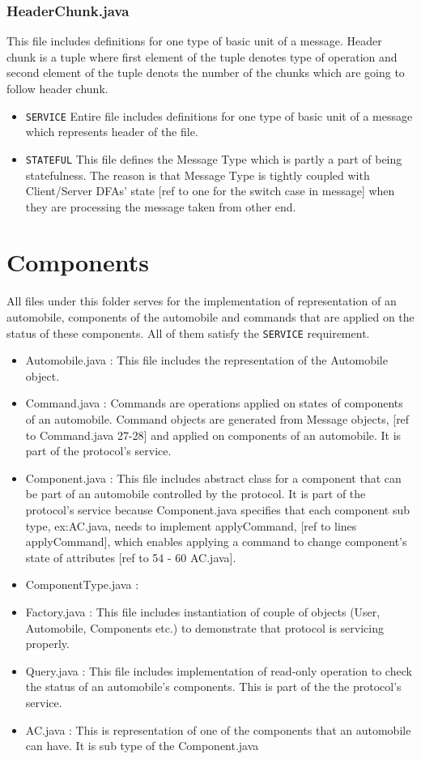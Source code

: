 \documentclass[12pt]{usenixsubmit}
\begin{document}
    \subsubsection{HeaderChunk.java}This file includes definitions for one type of basic unit of a message. Header chunk is a tuple where first element of the tuple denotes type of operation and second element of the tuple denots the number of the chunks which are going to follow header chunk.
    \begin{itemize}
    \item {\tt SERVICE} Entire file includes definitions for one type of basic unit of a message which represents header of the file.
      \item {\tt STATEFUL} This file defines the Message Type  which is partly a part of being statefulness. The reason is that Message Type is tightly coupled with Client/Server DFAs' state [ref to one for the switch case in message] when they are processing the message taken from other end.
     \end{itemize}   

  \section{Components} All files under this folder serves for the implementation of representation of an automobile, components of the automobile and commands that are applied on the status of these components. All of them satisfy the {\tt SERVICE} requirement.
  \begin{itemize}
  \item Automobile.java : This file includes the representation of the Automobile object.
  \item Command.java : Commands are operations applied on states of components of an automobile. Command objects are generated from Message objects, [ref to Command.java 27-28] and applied on components of an automobile. It is part of the protocol's service.
  \item Component.java :  This file includes abstract class for a component that can be part of an automobile controlled by the protocol. It is part of the protocol's service because Component.java specifies that each component sub type, ex:AC.java, needs to implement \textsf{applyCommand}, [ref to lines applyCommand], which enables applying a command to change component's state of attributes [ref to 54 - 60 AC.java]. 
  \item ComponentType.java : 
  \item Factory.java : This file includes instantiation of couple of objects (User, Automobile, Components etc.) to demonstrate that protocol is servicing properly.
  \item Query.java : This file includes implementation of read-only operation to check the status of an automobile's components. This is part of the the protocol's service.
  \item AC.java : This is representation of one of the components that an automobile can have. It is sub type of the Component.java
  \end{itemize}
  
\end{document}
